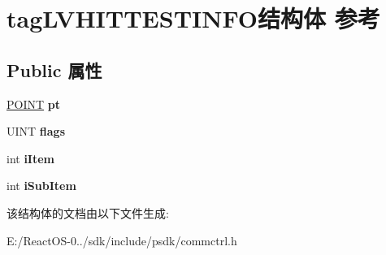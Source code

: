 \hypertarget{structtag_l_v_h_i_t_t_e_s_t_i_n_f_o}{}\section{tag\+L\+V\+H\+I\+T\+T\+E\+S\+T\+I\+N\+F\+O结构体 参考}
\label{structtag_l_v_h_i_t_t_e_s_t_i_n_f_o}
\subsection*{Public 属性}
\begin{DoxyCompactItemize}
\item 
\mbox{\label{structtag_l_v_h_i_t_t_e_s_t_i_n_f_o_aa6e2495df183d15ec0a767f81193d034}} 
\hyperlink{structtag_p_o_i_n_t}{P\+O\+I\+NT} {\bfseries pt}
\item 
\mbox{\label{structtag_l_v_h_i_t_t_e_s_t_i_n_f_o_ad5b6f0eb8d362f52a652ef64c2526c02}} 
U\+I\+NT {\bfseries flags}
\item 
\mbox{\label{structtag_l_v_h_i_t_t_e_s_t_i_n_f_o_acbedd0c060b8e661eea970ef6ef5c5bd}} 
int {\bfseries i\+Item}
\item 
\mbox{\label{structtag_l_v_h_i_t_t_e_s_t_i_n_f_o_ad964fe2c465a58ffa11ae7b0cc10230d}} 
int {\bfseries i\+Sub\+Item}
\end{DoxyCompactItemize}


该结构体的文档由以下文件生成\+:\begin{DoxyCompactItemize}
\item 
E\+:/\+React\+O\+S-\/0../sdk/include/psdk/commctrl.\+h\end{DoxyCompactItemize}
